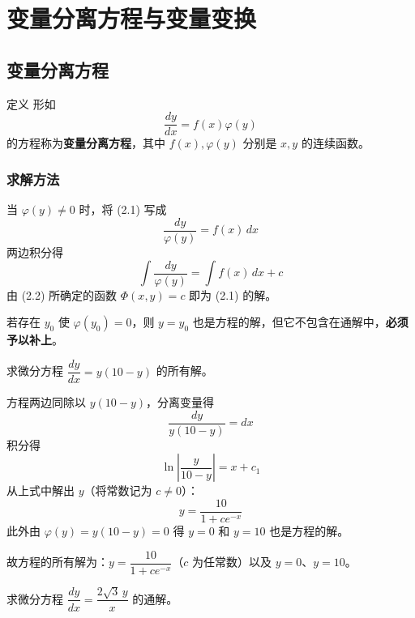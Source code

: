 \section{变量分离方程与变量变换}

\subsection{变量分离方程}

\begin{mydefinition}{定义}
形如
\begin{equation}\frac{dy}{dx} = f(x)\varphi(y) \tag{2.1}\end{equation}
的方程称为\textbf{变量分离方程}，其中 $f(x), \varphi(y)$ 分别是 $x, y$ 的连续函数。
\end{mydefinition}

\subsubsection{求解方法}

当 $\varphi(y) \neq 0$ 时，将 (2.1) 写成
\begin{equation}\frac{dy}{\varphi(y)} = f(x)\,dx \tag{2.2}\end{equation}
两边积分得
$$\int \frac{dy}{\varphi(y)} = \int f(x)\,dx + c$$
由 (2.2) 所确定的函数 $\Phi(x, y) = c$ 即为 (2.1) 的解。

\begin{remark}
若存在 $y_0$ 使 $\varphi(y_0) = 0$，则 $y = y_0$ 也是方程的解，但它不包含在通解中，\textbf{必须予以补上}。
\end{remark}

\begin{example}
求微分方程 $\dfrac{dy}{dx} = y(10 - y)$ 的所有解。
\end{example}

\begin{solution}
方程两边同除以 $y(10-y)$，分离变量得
$$\frac{dy}{y(10-y)} = dx$$
积分得
$$\ln\left|\frac{y}{10-y}\right| = x + c_1$$
从上式中解出 $y$（将常数记为 $c \neq 0$）：
$$y = \frac{10}{1 + ce^{-x}}$$
此外由 $\varphi(y) = y(10-y) = 0$ 得 $y = 0$ 和 $y = 10$ 也是方程的解。

故方程的所有解为：$y = \dfrac{10}{1+ce^{-x}}$（$c$ 为任常数）以及 $y = 0$、$y = 10$。
\end{solution}

\begin{example}
求微分方程 $\dfrac{dy}{dx} = \dfrac{2\sqrt{3}\,y}{x}$ 的通解。
\end{example}

